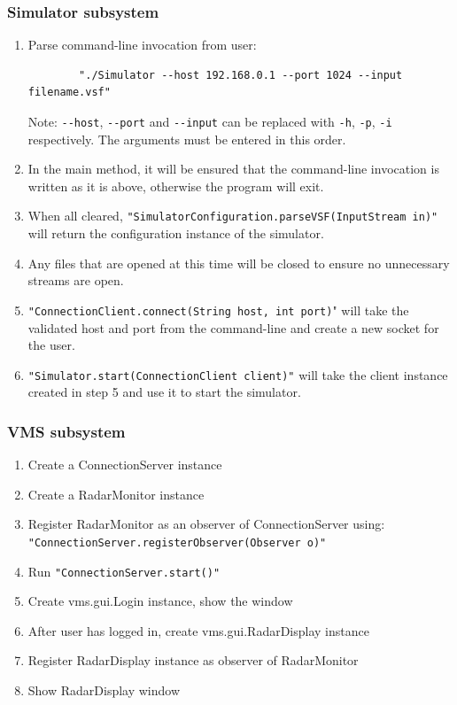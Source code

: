 \documentclass{article}
\begin{document}
\subsubsection{Simulator subsystem} %

\begin{enumerate}
  \item Parse command-line invocation from user: 
		\begin{verbatim}
		"./Simulator --host 192.168.0.1 --port 1024 --input filename.vsf"
		\end{verbatim}
		Note: \verb|--host|, \verb|--port| and \verb|--input| can be replaced with \verb|-h|, \verb|-p|, \verb|-i| respectively.
		\newline The arguments must be entered in this order.
  \item In the main method, it will be ensured that the command-line invocation is written as it is above, otherwise the program will exit.
  \item When all cleared, \verb|"SimulatorConfiguration.parseVSF(InputStream in)"| will return the configuration instance of the simulator.
  \item Any files that are opened at this time will be closed to ensure no unnecessary streams are open.
	\item \verb|"ConnectionClient.connect(String host, int port)|" will take the validated host and port from the command-line and create a new socket for the user.
	\item \verb|"Simulator.start(ConnectionClient client)"| will take the client instance created in step 5 and use it to start the simulator.	
\end{enumerate}

\subsubsection{VMS subsystem} %

\begin{enumerate}
	\item	Create a ConnectionServer instance
	\item Create a RadarMonitor instance
	\item Register RadarMonitor as an observer of ConnectionServer using:
		\newline \verb|"ConnectionServer.registerObserver(Observer o)"|
	\item Run \verb|"ConnectionServer.start()"|
	\item  Create vms.gui.Login instance, show the window
	\item After user has logged in, create vms.gui.RadarDisplay instance
	\item Register RadarDisplay instance as observer of RadarMonitor
	\item Show RadarDisplay window
\end{enumerate}
\end{document}
